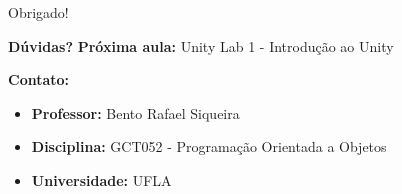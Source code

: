 \documentclass[aspectratio=169]{beamer}
\begin{document}
\begin{frame}{Obrigado!}
\begin{center}
\Large \textbf{Dúvidas?}
\vspace{1cm}
\normalsize
\textbf{Próxima aula:} Unity Lab 1 - Introdução ao Unity
\end{center}

\textbf{Contato:}
\begin{itemize}
    \item \textbf{Professor:} Bento Rafael Siqueira
    \item \textbf{Disciplina:} GCT052 - Programação Orientada a Objetos
    \item \textbf{Universidade:} UFLA
\end{itemize}
\end{frame}
\end{document}
